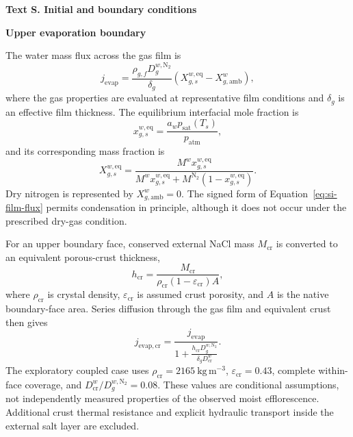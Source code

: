 \documentclass[draft,wrr]{agutexSI2019}
\newcounter{sitext}
\renewcommand{\thesitext}{S\arabic{sitext}}
\newcommand{\sitext}[1]{%
  \refstepcounter{sitext}%
  \par\medskip\noindent\textbf{Text \thesitext. #1}\par\medskip}
\newcommand{\sisub}[1]{\par\medskip\noindent\textbf{#1}\par\nobreak\smallskip}
\begin{document}
\begin{article}
\sitext{Initial and boundary conditions}\label{app:boundary}

\sisub{Upper evaporation boundary}

The water mass flux across the gas film is
\begin{equation}
j_{\mathrm{evap}}=
\frac{\rho_{g,f}D_g^{w,\mathrm{N_2}}}{\delta_g}
\left(X_{g,s}^{w,\mathrm{eq}}-X_{g,\mathrm{amb}}^w\right),
\label{eq:si-film-flux}
\end{equation}
where the gas properties are evaluated at representative film conditions and
$\delta_g$ is an effective film thickness. The equilibrium interfacial mole
fraction is
\begin{equation}
x_{g,s}^{w,\mathrm{eq}}
=\frac{a_w p_{\mathrm{sat}}(T_s)}{p_{\mathrm{atm}}},
\label{eq:si-vapor-equilibrium}
\end{equation}
and its corresponding mass fraction is
\begin{equation}
X_{g,s}^{w,\mathrm{eq}}=
\frac{M^w x_{g,s}^{w,\mathrm{eq}}}
{M^w x_{g,s}^{w,\mathrm{eq}}+
M^{\mathrm{N_2}}\left(1-x_{g,s}^{w,\mathrm{eq}}\right)}.
\label{eq:si-mole-to-mass}
\end{equation}
Dry nitrogen is represented by $X_{g,\mathrm{amb}}^w=0$. The signed form of
Equation~\ref{eq:si-film-flux} permits condensation in principle, although it
does not occur under the prescribed dry-gas condition.

For an upper boundary face, conserved external NaCl mass $M_{\mathrm{cr}}$ is
converted to an equivalent porous-crust thickness,
\begin{equation}
h_{\mathrm{cr}}=
\frac{M_{\mathrm{cr}}}
{\rho_{\mathrm{cr}}(1-\varepsilon_{\mathrm{cr}})A},
\label{eq:si-crust-thickness}
\end{equation}
where $\rho_{\mathrm{cr}}$ is crystal density,
$\varepsilon_{\mathrm{cr}}$ is assumed crust porosity, and $A$ is the native
boundary-face area. Series diffusion through the gas film and equivalent crust
then gives
\begin{equation}
j_{\mathrm{evap,cr}}=
\frac{j_{\mathrm{evap}}}
{1+\displaystyle\frac{h_{\mathrm{cr}}D_g^{w,\mathrm{N_2}}}
{\delta_gD_{\mathrm{cr}}^w}}.
\label{eq:si-crust-flux}
\end{equation}
The exploratory coupled case uses $\rho_{\mathrm{cr}}=2165~\mathrm{kg\,m^{-3}}$,
$\varepsilon_{\mathrm{cr}}=0.43$, complete within-face coverage, and
$D_{\mathrm{cr}}^w/D_g^{w,\mathrm{N_2}}=0.08$. These values are conditional
assumptions, not independently measured properties of the observed moist
efflorescence. Additional crust thermal resistance and explicit hydraulic
transport inside the external salt layer are excluded.


\end{article}
\end{document}
